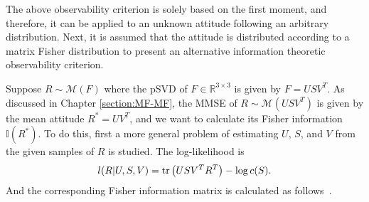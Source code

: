 The above observability criterion is solely based on the first moment, and therefore, it can be applied to an unknown attitude following an arbitrary distribution. 
Next, it is assumed that the attitude is distributed according to a matrix Fisher distribution to present an alternative information theoretic observability criterion.

Suppose $R\sim \mathcal{M}(F)$ where the pSVD of $F\in\mathbb{R}^{3\times 3}$ is given by $F=USV^T$.
As discussed in Chapter \ref{section:MF-MF}, the MMSE of $R\sim\mathcal{M}(USV^T)$ is given by the mean attitude $R^*=UV^T$, and we want to calculate its Fisher information $\mathbb{I}(R^*)$.
To do this, first a more general problem of estimating $U$, $S$, and $V$ from the given samples of $R$ is studied.
The log-likelihood is
\begin{align} \label{eqn:observability-FIM-likelihood}
	l(R|U,S,V) = \mathrm{tr}\left( USV^T R^T \right) - \log c(S).
\end{align}
And the corresponding Fisher information matrix is calculated as follows~\cite{smith2005covariance}.

